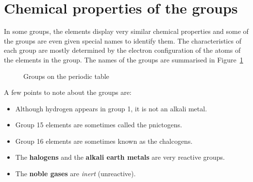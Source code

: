 \section{Chemical properties of the groups}
 \label{m38760*secfhsst!!!underscore!!!id1062}
            \nopagebreak
            \label{m38760*id261554} In some groups, the elements display very similar chemical properties and some of the groups are even given special names to identify them. The characteristics of each group are mostly determined by the electron configuration of the atoms of the elements in the group. The names of the groups are summarised in Figure~\ref{fig:atom:periodic}\par
\begin{figure}[H]

\begin{center}
\end{center}

\caption{Groups on the periodic table}
\label{fig:atom:periodic}
\end{figure}  
A few points to note about the groups are:
        \label{m38757*id261581}\begin{itemize}[noitemsep]
            \label{m38757*uid135}\item Although hydrogen appears in group 1, it is not an alkali metal.
\item Group 15 elements are sometimes called the pnictogens.
\label{m38757*id6232}\item Group 16 elements are sometimes known as the chalcogens.
\label{m38757*uid142}\item The \textbf{halogens} and the \textbf{alkali earth metals} are very reactive groups.
\label{m38757*uid143}\item The \textbf{noble gases} are \textsl{inert} (unreactive).   
\end{itemize}            

